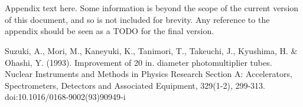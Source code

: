 \documentclass[journal]{IEEEtran}
\begin{document}
\appendices
\section{}
Appendix text here.  Some information is beyond the scope of the current version of this document, and so is not included for brevity.  Any reference to the appendix should be seen as a TODO for the final version.


%
%
%

\begin{thebibliography}{1}
  
Suzuki, A., Mori, M., Kaneyuki, K., Tanimori, T., Takeuchi, J., Kyushima, H. \& Ohashi, Y. (1993). Improvement of 20 in. diameter photomultiplier tubes. Nuclear Instruments and Methods in Physics Research Section A: Accelerators, Spectrometers, Detectors and Associated Equipment, 329(1-2), 299-313. doi:10.1016/0168-9002(93)90949-i

\end{thebibliography}



\end{document}
